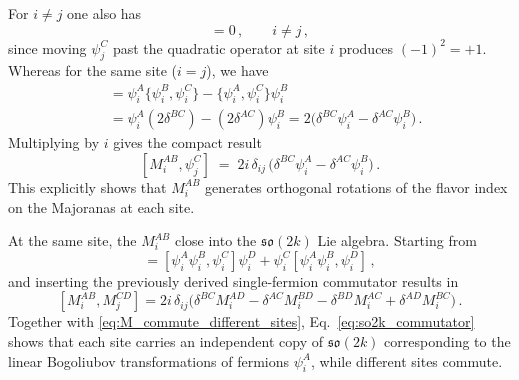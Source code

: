 \documentclass{article}
\theoremstyle{definition}
\begin{document}
    For $i\neq j$ one also has
    \begin{equation}
        [M_{i}^{AB},\psi_{j}^{C}]=0\,,\qquad i\neq j\,, \label{eq:M_commute_fermion_other_site}
    \end{equation}
    since moving $\psi_{j}^{C}$ past the quadratic operator at site $i$ produces
    $(-1)^{2}=+1$. Whereas for the same site ($i=j$), we have
    \begin{align}
        [\psi_{i}^{A}\psi_{i}^{B},\psi_{i}^{C}] & = \psi_{i}^{A}\{\psi_{i}^{B},\psi_{i}^{C}\}-\{\psi_{i}^{A},\psi_{i}^{C}\}\psi_{i}^{B}\nonumber                         \\
                                                & = \psi_{i}^{A}(2\delta^{BC})-(2\delta^{AC})\psi_{i}^{B}= 2\big(\delta^{BC}\psi_{i}^{A}-\delta^{AC}\psi_{i}^{B}\big)\,.
    \end{align}
    Multiplying by $i$ gives the compact result
    \begin{equation}
        \boxed{ [M_i^{AB},\psi_j^C] \;=\; 2i\,\delta_{ij}\,\big(\delta^{BC}\psi_i^A-\delta^{AC}\psi_i^B\big)\,. }
        \label{eq:M_comm_psi}
    \end{equation}
    This explicitly shows that $M_{i}^{AB}$ generates orthogonal rotations of
    the flavor index on the Majoranas at each site.

    At the same site, the $M_{i}^{AB}$ close into the $\mathfrak{so}(2k)$ Lie algebra.
    Starting from
    \begin{equation}
        [\psi_{i}^{A}\psi_{i}^{B},\psi_{i}^{C}\psi_{i}^{D}] = [\psi_{i}^{A}\psi_{i}
        ^{B},\psi_{i}^{C}]\psi_{i}^{D}+ \psi_{i}^{C}[\psi_{i}^{A}\psi_{i}^{B},\psi
        _{i}^{D}]\,,
    \end{equation}
    and inserting the previously derived single-fermion commutator results in
    \begin{equation}
        \boxed{ [M_i^{AB},M_j^{CD}] = 2i\,\delta_{ij}\Big( \delta^{BC}M_i^{AD} -\delta^{AC}M_i^{BD} -\delta^{BD}M_i^{AC} +\delta^{AD}M_i^{BC} \Big)\,. }
        \label{eq:so2k_commutator}
    \end{equation}
    Together with \eqref{eq:M_commute_different_sites}, Eq.~\eqref{eq:so2k_commutator}
    shows that each site carries an independent copy of $\mathfrak{so}(2k)$
    corresponding to the linear Bogoliubov transformations of fermions
    $\psi_{i}^{A}$, while different sites commute.
\end{document}
